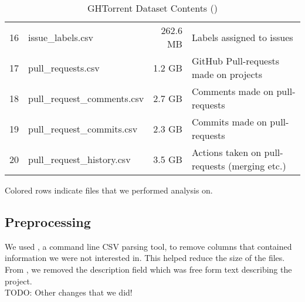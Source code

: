 \begin{table}[htb]
\begin{tabular}{@{}llrl@{}}
           16 & issue\_labels.csv           & 262.6 MB & Labels assigned to issues \\
           \rowcolor{LightCyan}
           17 & pull\_requests.csv          & 1.2 GB   & GitHub Pull-requests made on projects \\
           18 & pull\_request\_comments.csv & 2.7 GB   & Comments made on pull-requests \\
           19 & pull\_request\_commits.csv  & 2.3 GB   & Commits made on pull-requests \\
           20 & pull\_request\_history.csv  & 3.5 GB   & Actions taken on pull-requests (merging etc.) \\

        \bottomrule
    \end{tabular}

    \caption{GHTorrent Dataset Contents ()}
    \small{Colored rows indicate files that we performed analysis on.}
\end{table}

\newpage
\subsection{Preprocessing}

We used , a command line CSV parsing tool, to remove columns that contained information we were not interested in. This helped reduce the size of the files. \\

From , we removed the description field which was free form text describing the project. \\

\large{ TODO: Other changes that we did! }

